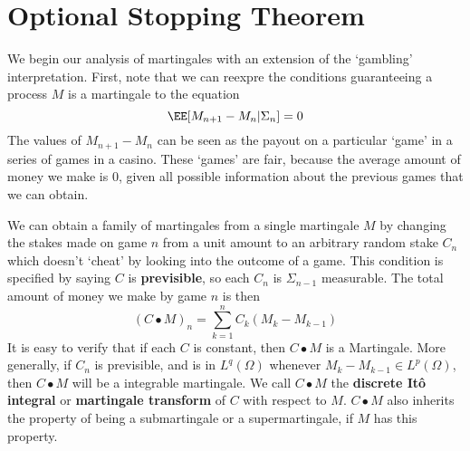 \section{Optional Stopping Theorem}

We begin our analysis of martingales with an extension of the `gambling' interpretation. First, note that we can reexpre the conditions guaranteeing a process $M$ is a martingale to the equation
%
\[ \EE[M_{n+1} - M_n | \Sigma_n] = 0 \]
%
The values of $M_{n+1} - M_n$ can be seen as the payout on a particular `game' in a series of games in a casino. These `games' are fair, because the average amount of money we make is 0, given all possible information about the previous games that we can obtain.

We can obtain a family of martingales from a single martingale $M$ by changing the stakes made on game $n$ from a unit amount to an arbitrary random stake $C_n$ which doesn't `cheat' by looking into the outcome of a game. This condition is specified by saying $C$ is {\bf previsible}, so each $C_n$ is $\Sigma_{n-1}$ measurable. The total amount of money we make by game $n$ is then
%
\[ (C \bullet M)_n = \sum_{k = 1}^n C_k(M_k - M_{k-1}) \]
%
It is easy to verify that if each $C$ is constant, then $C \bullet M$ is a Martingale. More generally, if $C_n$ is previsible, and is in $L^q(\Omega)$ whenever $M_k - M_{k-1} \in L^p(\Omega)$, then $C \bullet M$ will be a integrable martingale. We call $C \bullet M$ the {\bf discrete It\^{o} integral} or {\bf martingale transform} of $C$ with respect to $M$. $C \bullet M$ also inherits the property of being a submartingale or a supermartingale, if $M$ has this property.

